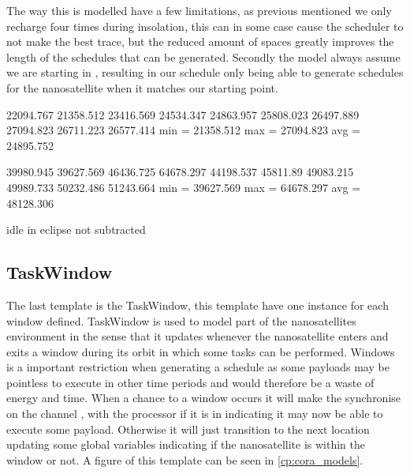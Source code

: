 The way this is modelled have a few limitations, as previous mentioned we only recharge four times during insolation, this can in some case cause the scheduler to not make the best trace, but the reduced amount of spaces greatly improves the length of the schedules that can be generated. 
Secondly the model always assume we are starting in , resulting in our schedule only being able to generate schedules for the nanosatellite when it matches our starting point.

22094.767
21358.512
23416.569
24534.347
24863.957
25808.023
26497.889
27094.823
26711.223
26577.414
min = 21358.512
max = 27094.823
avg = 24895.752

39980.945
39627.569
46436.725
64678.297
44198.537
45811.89
49083.215
49989.733
50232.486
51243.664
min = 39627.569
max = 64678.297
avg = 48128.306

idle in eclipse not subtracted

\subsection*{TaskWindow}
The last template is the TaskWindow, this template have one instance for each window defined. TaskWindow is used to model part of the nanosatellites environment in the sense that it updates whenever the nanosatellite enters and exits a window during its orbit in which some tasks can be performed. Windows is a important restriction when generating a schedule as some payloads may be pointless to execute in other time periods and would therefore be a waste of energy and time. When a chance to a window occurs it will make the synchronise on the channel , with the processor if it is in  indicating it may now be able to execute some payload. Otherwise it will just transition to the next location updating some global variables indicating if the nanosatellite is within the window or not. 
A figure of this template can be seen in \cref{cp:cora_models}.

